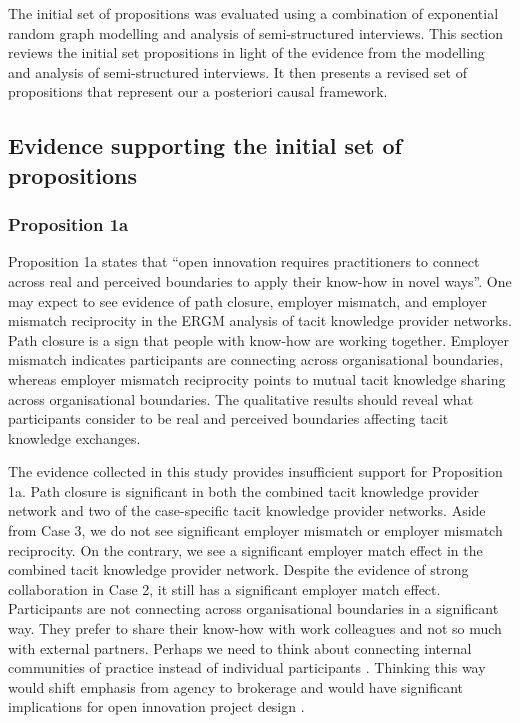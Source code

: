 The initial set of propositions was evaluated using a combination of exponential random graph modelling and analysis of semi-structured interviews. This section reviews the initial set propositions in light of the evidence from the modelling and analysis of semi-structured interviews. It then presents a revised set of propositions that represent our a posteriori causal framework. 

\subsection{Evidence supporting the initial set of propositions}

\subsubsection{Proposition 1a}

Proposition 1a states that \enquote{open innovation requires practitioners to connect across real and perceived boundaries to apply their know-how in novel ways}. One may expect to see evidence of path closure, employer mismatch, and employer mismatch reciprocity in the ERGM analysis of tacit knowledge provider networks. Path closure is a sign that people with know-how are working together. Employer mismatch indicates participants are connecting across organisational boundaries, whereas employer mismatch reciprocity points to mutual tacit knowledge sharing across organisational boundaries. The qualitative results should reveal what participants consider to be real and perceived boundaries affecting tacit knowledge exchanges. \medskip 

The evidence collected in this study provides insufficient support for Proposition 1a. Path closure is significant in both the combined tacit knowledge provider network and two of the case-specific tacit knowledge provider networks. Aside from Case 3, we do not see significant employer mismatch or employer mismatch reciprocity. On the contrary, we see a significant employer match effect in the combined tacit knowledge provider network. Despite the evidence of strong collaboration in Case 2, it still has a significant employer match effect. Participants are not connecting across organisational boundaries in a significant way. They prefer to share their know-how with work colleagues and not so much with external partners. Perhaps we need to think about connecting internal communities of practice instead of individual participants \citep{garrety2004integrating,venkitachalam2012tacit}. Thinking this way would shift emphasis from agency to brokerage and would have significant implications for open innovation project design \citep{wenger2000communities}. 

